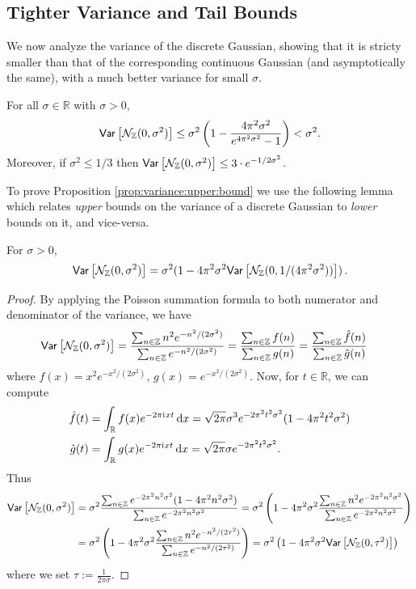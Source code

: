 \documentclass{jpc}
\newcommand{\ii}{\mathrm{i}\mkern1mu}
\newcommand{\var}[2]{{\ifx&#1& \mathsf{Var} \else
\underset{#1}{\mathsf{Var}} \fi \left[#2\right]}}
\newcommand{\eqdef}{:=}
\newcommand{\dx}[1][x]{\mathrm{d}#1}
\newcommand{\Z}{\mathbb{Z}}
\newcommand{\R}{\mathbb{R}}
\begin{document}
\subsection{Tighter Variance and Tail Bounds}
\label{sec:tighter-bounds}
We now analyze the variance of the discrete Gaussian, showing that it is stricty smaller than that of the corresponding continuous Gaussian (and asymptotically the same), with a much better variance for small $\sigma$.
\begin{prop}[Variance]
  \label{prop:variance:upper:bound}
    For all $\sigma \in \R$ with $\sigma>0$,
\begin{equation}
\var{}{\discN(0,\sigma^2)} \leq \sigma^2 \left(1 - \frac{4\pi^2\sigma^2}{e^{4\pi^2\sigma^2}-1} \right)<\sigma^2.
\end{equation}
Moreover, if $\sigma^2\le 1/3$ then $\var{}{\discN(0,\sigma^2)} \le 3 \cdot e^{-1/2\sigma^2}$.
\end{prop}
To prove Proposition \ref{prop:variance:upper:bound} we use the following lemma which relates \emph{upper} bounds on the variance of a discrete Gaussian to \emph{lower} bounds on it, and vice-versa.
\begin{lem}\label{lem:upper=lower}
For $\sigma>0$, 
\begin{equation}
    \label{eq:relation:variances}
\var{}{\discN(0,\sigma^2)} = \sigma^2 (1 - 4\pi^2\sigma^2\var{}{\discN(0,1/(4\pi^2\sigma^2))} )\,.
\end{equation}
\end{lem}
\begin{proof}
By applying the Poisson summation formula to both numerator and denominator of the variance, we have
\begin{align*}
    \var{}{\discN(0,\sigma^2)} 
    &= \frac{\sum_{n\in \Z} n^2 e^{-n^2/(2\sigma^2)}}{\sum_{n\in\Z} e^{-n^2/(2\sigma^2)}}
    = \frac{\sum_{n\in \Z} f(n)}{\sum_{n\in \Z} g(n)}
    = \frac{\sum_{n\in \Z} \hat{f}(n)}{\sum_{n\in \Z} \hat{g}(n)}
\end{align*}
where $f(x) = x^2 e^{-x^2/(2\sigma^2)}$, $g(x) = e^{-x^2/(2\sigma^2)}$. Now, for $t\in\R$, we can compute
\begin{align*}
    \hat{f}(t) &= \int_{\R} f(x) e^{-2\pi\ii{}x t}\,\dx = \sqrt{2\pi} \sigma^3 e^{-2\pi^2t^2\sigma^2} (1- 4\pi^2t^2\sigma^2)\\
    \hat{g}(t) &= \int_{\R} g(x) e^{-2\pi\ii{}x t}\,\dx = \sqrt{2\pi} \sigma e^{-2\pi^2t^2\sigma^2}.
\end{align*}
Thus
\begin{align*}
    \var{}{\discN(0,\sigma^2)} 
    &= \sigma^2\frac{\sum_{n\in \Z} e^{-2\pi^2n^2\sigma^2} (1- 4\pi^2n^2\sigma^2) }{\sum_{n\in \Z} e^{-2\pi^2n^2\sigma^2}}
    = \sigma^2\left( 1 - 4\pi^2\sigma^2\frac{\sum_{n\in \Z} n^2e^{-2\pi^2n^2\sigma^2} }{\sum_{n\in \Z} e^{-2\pi^2n^2\sigma^2}}\right) \\
    &= \sigma^2\left( 1 - 4\pi^2\sigma^2\frac{\sum_{n\in \Z} n^2 e^{-n^2/(2\tau^2)} }{\sum_{n\in \Z} e^{-n^2/(2\tau^2)}}\right)
    = \sigma^2\left( 1 - 4\pi^2\sigma^2\var{}{\discN(0,\tau^2)} \right)
\end{align*}
where we set $\tau \eqdef \frac{1}{2\pi\sigma}$.
\end{proof}
\end{document}
